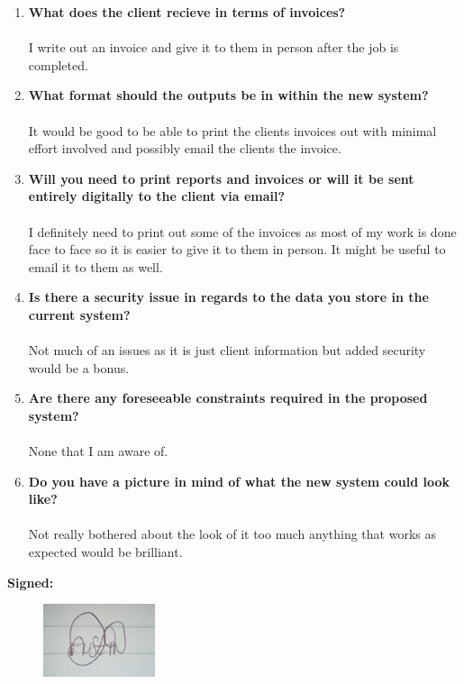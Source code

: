 \begin{enumerate}
	\item \textbf{What does the client recieve in terms of invoices?}
		\\ \\ I write out an invoice and give it to them in person after the job is completed.
	\item \textbf{What format should the outputs be in within the new system?}
		\\ \\ It would be good to be able to print the clients invoices out with minimal effort involved and possibly email the clients the invoice.
	\item \textbf{Will you need to print reports and invoices or will it be sent entirely digitally to the client via email?}
		\\ \\ I definitely need to print out some of the invoices as most of my work is done face to face so it is easier to give it to them in person. It might be useful to email it to them as well.
	\item \textbf{Is there a security issue in regards to the data you store in the current system?}
		\\ \\ Not much of an issues as it is just client information  but added security would be a bonus.
	\item \textbf{Are there any foreseeable constraints required in the proposed system?}
		\\ \\ None that I am aware of.
	\item \textbf{Do you have a picture in mind of what the new system could look like?}
		\\ \\ Not really bothered about the look of it too much anything that works as expected would be brilliant.

\end{enumerate}

\begin{flushleft}
	\textbf{Signed:}
\begin{figure}[H]
    \includegraphics{./Analysis/images/signature.jpg}
\end{figure}

\end{flushleft}



